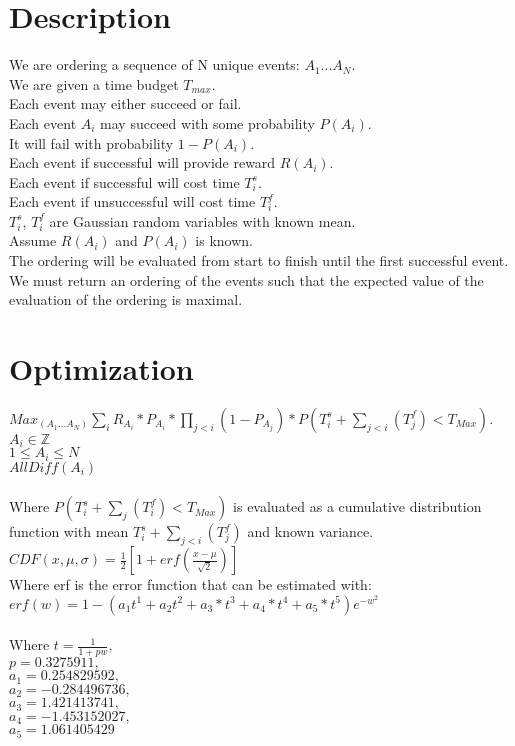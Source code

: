 \documentclass[12pt]{article}
\begin{document}
\date{}

\maketitle
	\section*{Description}
		We are ordering a sequence of N unique events: $A_{1}...A_{N}$.\\
		We are given a time budget $T_{max}$.\\
		Each event may either succeed or fail.\\
		Each event $A_{i}$ may succeed with some probability $P(A_{i})$.\\
		It will fail with probability $1-P(A_{i})$.\\
		Each event if successful will provide reward $R(A_{i})$.\\
		Each event if successful will cost time $T_{i}^{s}$.\\
		Each event if unsuccessful will cost time $T_{i}^{f}$.\\
		$T_{i}^{s}$, $T_{i}^{f}$ are Gaussian random variables with known mean.\\
		Assume $R(A_{i})$ and $P(A_{i})$ is known.\\
		The ordering will be evaluated from start to finish until the first successful event.
		We must return an ordering of the events such that the expected value of the evaluation of the ordering is maximal.\\
	\newpage
	\section*{Optimization}
		$Max_{(A_1...A_N)}\sum_{i} R_{A_{i}}*P_{A_{i}}*\prod_{j<i} (1-P_{A_{j}})*P(T_{i}^{s}+\sum_{j<i}(T_{j}^{f})<T_{Max})$.\\
		$A_{i} \in \mathbb{Z}$\\
		$1 \le A_{i} \le N$\\
		$AllDiff(A_i)$\\\\
        \noindent
        Where $P(T_{i}^{s}+\sum_{j}(T_{i}^{f})<T_{Max})$ is evaluated as a cumulative distribution function with 
        mean $T_{i}^{s}+\sum_{j<i}(T_{j}^{f})$ and known variance.\\

        \noindent
        $CDF(x,\mu,\sigma) = \frac{1}{2}[1+erf(\frac{x-\mu}{\sqrt{2}})]$ \\
        Where erf is the error function that can be estimated with:\\
        $erf(w) = 1 - (a_1t^1+a_2t^2+a_3*t^3+a_4*t^4+a_5*t^5)e^{-w^2}$\\\\
        Where $t = \frac{1}{1+pw},$\\
        $p = 0.3275911,$\\
        $a_1 = 0.254829592,$\\
        $a_2 = −0.284496736,$\\
        $a_3 = 1.421413741,$\\
        $a_4 = −1.453152027,$\\
        $a_5 = 1.061405429$ 
	\newpage
\end{document}
